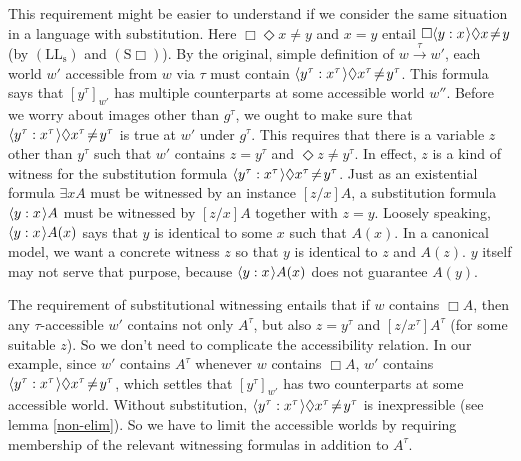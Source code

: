 \documentclass[11pt]{woarticle}
\newcommand{\cmnt}[1]{\iffalse #1 \fi}
\theoremstyle{break}
\theoremstyle{nonumberplain}
\newcommand{\1}{\;\,|\;\,}
\renewcommand{\t}[1]{\ensuremath{\langle #1  \makebox[.2ex]{}\rangle}}
\newcommand{\T}[1]{\ensuremath{(\mathrm{ #1})}}
\begin{document}
This requirement might be easier to understand if we consider the same situation
in a language with substitution. Here $\Box\Diamond x\!\not=\!y$ and $x\!=\!y$
entail $\Box \t{y:x}\Diamond x\!\not=\!y$ (by \T{LL_s} and \T{S\Box}). By the
original, simple definition of $w \xrightarrow{\tau} w'$, each world $w'$
accessible from $w$ via $\tau$ must contain
$\t{y^\tau:x^\tau}\Diamond x^\tau\!\not=\!y^\tau$. This formula says that
$[y^\tau]_{w'}$ has multiple counterparts at some accessible world $w''$. Before
we worry about images other than $g^\tau$, we ought to make sure that
$\t{y^\tau:x^\tau}\Diamond x^\tau\!\not=\!y^\tau$ is true at $w'$ under
$g^\tau$. This requires that there is a variable $z$ other than $y^\tau$ such
that $w'$ contains $z\!=\!y^\tau$ and $\Diamond z\!\not=\!y^\tau$. In effect,
$z$ is a kind of witness for the substitution formula
$\t{y^\tau:x^\tau}\Diamond x^\tau\!\not=\!y^\tau$. Just as an existential
formula $\exists x A$ must be witnessed by an instance $[z/x]A$, a substitution
formula $\t{y:x}A$ must be witnessed by $[z/x]A$ together with $z\!=\!y$.
Loosely speaking, $\t{y:x}A(x)$ says that $y$ is identical to some $x$ such that
$A(x)$. In a canonical model, we want a concrete witness $z$ so that $y$ is
identical to $z$ and $A(z)$. $y$ itself may not serve that purpose, because
$\t{y:x}A(x)$ does not guarantee $A(y)$.

The requirement of substitutional witnessing entails that if $w$ contains
$\Box A$, then any $\tau$-accessible $w'$ contains not only $A^\tau$, but also
$z\!=\!y^\tau$ and $[z/x^\tau]A^\tau$ (for some suitable $z$). So we don't need
to complicate the accessibility relation. In our example, since $w'$ contains
$A^\tau$ whenever $w$ contains $\Box A$, $w'$ contains
$\t{y^\tau:x^\tau}\Diamond x^\tau\!\not=\!y^\tau$, which settles that
$[y^\tau]_{w'}$ has two counterparts at some accessible world. Without
substitution, $\t{y^\tau:x^\tau}\Diamond x^\tau\!\not=\!y^\tau$ is inexpressible
(see lemma \ref{non-elim}). So we have to limit the accessible worlds by
requiring membership of the relevant witnessing formulas in addition to
$A^\tau$.


\cmnt{%
  Wouldn't it suffice to require that if $w$ contains $x\!=\!y$ and $\Box A$,
  then $w'$ contains $z\!=\!y^\tau$ as well as $A^\tau$? Since $w$ also contains
  $y\!=\!x$, it follows that $w'$ also contains $z'\!=\!x^\tau$. By \T{LL^*},
  $w'$ then also contains $[z/y^\tau]A^\tau$ and $[z'/x^\tau]A^\tau$. -- Yes,
  but that's not enough. We get
  $\{ z=y^\tau, z'=x^\tau, \Diamond z'\not=y^\tau, \Diamond x^\tau \not= z \} \subseteq w'$.
  But this is compatible with $[x^\tau, z']$ not having two counterparts at some
  accessible world.%
} %
\end{document}
